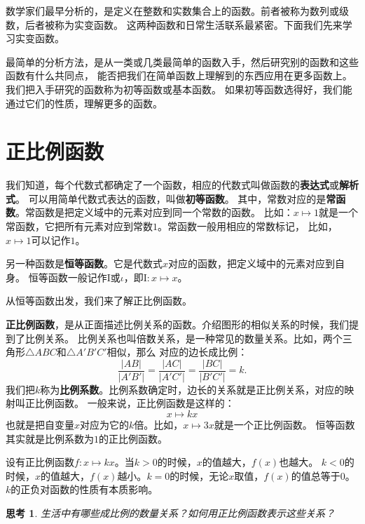 \documentclass[12pt,UTF8]{ctexbook}
\newtheorem{sk}{思考}[section]
\begin{document}
数学家们最早分析的，是定义在整数和实数集合上的函数。前者被称为数列或级数，后者被称为实变函数。
这两种函数和日常生活联系最紧密。下面我们先来学习实变函数。

最简单的分析方法，是从一类或几类最简单的函数入手，然后研究别的函数和这些函数有什么共同点，
能否把我们在简单函数上理解到的东西应用在更多函数上。我们把入手研究的函数称为初等函数或基本函数。
如果初等函数选得好，我们能通过它们的性质，理解更多的函数。

\section{正比例函数}
我们知道，每个代数式都确定了一个函数，相应的代数式叫做函数的\textbf{表达式}或\textbf{解析式}。
可以用简单代数式表达的函数，叫做\textbf{初等函数}。
其中，常数对应的是\textbf{常函数}。常函数是把定义域中的元素对应到同一个常数的函数。
比如：$x\mapsto 1$就是一个常函数，它把所有元素对应到常数$1$。常函数一般用相应的常数标记，
比如，$x\mapsto 1$可以记作$1$。

另一种函数是\textbf{恒等函数}。它是代数式$x$对应的函数，把定义域中的元素对应到自身。
恒等函数一般记作$\mathrm{I}$或$\iota$，即$\mathrm{I}:x \mapsto x$。

从恒等函数出发，我们来了解正比例函数。

\textbf{正比例函数}，是从正面描述比例关系的函数。介绍图形的相似关系的时候，我们提到了比例关系。
比例关系也叫倍数关系，是一种常见的数量关系。比如，两个三角形$\triangle ABC$和$\triangle A'B'C'$相似，那么
对应的边长成比例：
$$ \frac{|AB|}{|A'B'|} = \frac{|AC|}{|A'C'|} = \frac{|BC|}{|B'C'|} = k.$$
我们把$k$称为\textbf{比例系数}。比例系数确定时，边长的关系就是正比例关系，对应的映射叫正比例函数。
一般来说，正比例函数是这样的：
$$ x \mapsto kx$$
也就是把自变量$x$对应为它的$k$倍。比如，$x \mapsto 3x$就是一个正比例函数。
恒等函数其实就是比例系数为$1$的正比例函数。

设有正比例函数$f: x\mapsto kx$。当$k>0$的时候，$x$的值越大，$f(x)$也越大。
$k<0$的时候，$x$的值越大，$f(x)$越小。$k=0$的时候，无论$x$取值，$f(x)$的值总等于$0$。
$k$的正负对函数的性质有本质影响。

\begin{sk}\label{sk:5-0-0}
    生活中有哪些成比例的数量关系？如何用正比例函数表示这些关系？
\end{sk}
\end{document}
